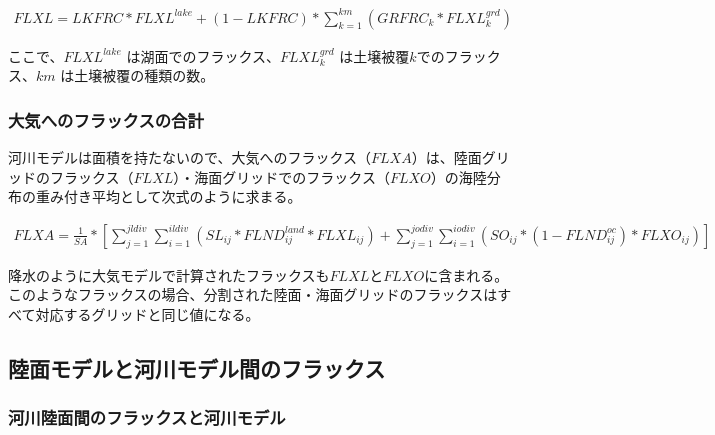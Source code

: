 \begin{eqnarray} FLXL = LKFRC * FLXL^{lake} + (1-LKFRC) * \sum_{k=1}^{km} (GRFRC_k * FLXL_k^{grd}) \end{eqnarray}

ここで、\(FLXL^{lake}\) は湖面でのフラックス、\(FLXL_{k}^{grd}\)
は土壌被覆\(k\)でのフラックス、\(km\) は土壌被覆の種類の数。

\hypertarget{ux5927ux6c17ux3078ux306eux30d5ux30e9ux30c3ux30afux30b9ux306eux5408ux8a08}{%
\subsubsection{大気へのフラックスの合計}\label{ux5927ux6c17ux3078ux306eux30d5ux30e9ux30c3ux30afux30b9ux306eux5408ux8a08}}

河川モデルは面積を持たないので、大気へのフラックス（\(FLXA\)）は、陸面グリッドのフラックス（\(FLXL\)）・海面グリッドでのフラックス（\(FLXO\)）の海陸分布の重み付き平均として次式のように求まる。

\begin{eqnarray} FLXA = \frac{1}{SA} * [ \sum _ {j=1}^{jldiv} \sum_{i=1}^{ildiv}(SL _ {ij} * FLND^{land} _ {ij}*FLXL_{ij}) + \sum _ {j=1}^{jodiv}\sum _ {i=1}^{iodiv}(SO _ {ij} * (1-FLND^{oc} _ {ij}) * FLXO _ {ij})] \end{eqnarray}

降水のように大気モデルで計算されたフラックスも\(FLXL\)と\(FLXO\)に含まれる。
このようなフラックスの場合、分割された陸面・海面グリッドのフラックスはすべて対応するグリッドと同じ値になる。

\hypertarget{ux9678ux9762ux30e2ux30c7ux30ebux3068ux6cb3ux5dddux30e2ux30c7ux30ebux9593ux306eux30d5ux30e9ux30c3ux30afux30b9}{%
\subsection{陸面モデルと河川モデル間のフラックス}\label{ux9678ux9762ux30e2ux30c7ux30ebux3068ux6cb3ux5dddux30e2ux30c7ux30ebux9593ux306eux30d5ux30e9ux30c3ux30afux30b9}}

\hypertarget{ux6cb3ux5dddux9678ux9762ux9593ux306eux30d5ux30e9ux30c3ux30afux30b9ux3068ux6cb3ux5dddux30e2ux30c7ux30eb}{%
\subsubsection{河川陸面間のフラックスと河川モデル}\label{ux6cb3ux5dddux9678ux9762ux9593ux306eux30d5ux30e9ux30c3ux30afux30b9ux3068ux6cb3ux5dddux30e2ux30c7ux30eb}}

